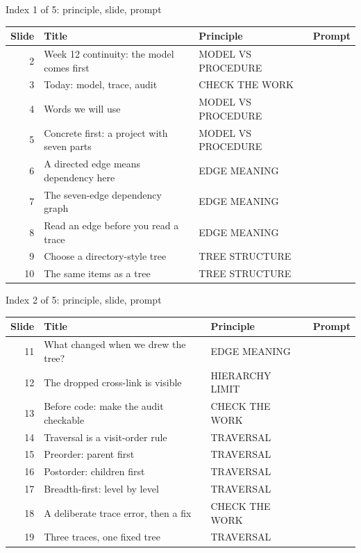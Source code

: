 \begin{frame}{Index 1 of 5: principle, slide, prompt}
\scriptsize
\begin{tabular}{@{}r>{\raggedright\arraybackslash}p{5.1cm}>{\raggedright\arraybackslash}p{4.7cm}p{1.2cm}@{}}
\textbf{Slide} & \textbf{Title} & \textbf{Principle} & \textbf{Prompt}\\\midrule
2 & Week 12 continuity: the model comes first & MODEL VS PROCEDURE & \\
3 & Today: model, trace, audit & CHECK THE WORK & \\
4 & Words we will use & MODEL VS PROCEDURE & \\
5 & Concrete first: a project with seven parts & MODEL VS PROCEDURE & \\
6 & A directed edge means dependency here & EDGE MEANING & \\
7 & The seven-edge dependency graph & EDGE MEANING & \\
8 & Read an edge before you read a trace & EDGE MEANING & \\
9 & Choose a directory-style tree & TREE STRUCTURE & \\
10 & The same items as a tree & TREE STRUCTURE & \\
\end{tabular}
\end{frame}
\begin{frame}{Index 2 of 5: principle, slide, prompt}
\scriptsize
\begin{tabular}{@{}r>{\raggedright\arraybackslash}p{5.1cm}>{\raggedright\arraybackslash}p{4.7cm}p{1.2cm}@{}}
\textbf{Slide} & \textbf{Title} & \textbf{Principle} & \textbf{Prompt}\\\midrule
11 & What changed when we drew the tree? & EDGE MEANING & \\
12 & The dropped cross-link is visible & HIERARCHY LIMIT & \\
13 & Before code: make the audit checkable & CHECK THE WORK & \\
14 & Traversal is a visit-order rule & TRAVERSAL & \\
15 & Preorder: parent first & TRAVERSAL & \\
16 & Postorder: children first & TRAVERSAL & \\
17 & Breadth-first: level by level & TRAVERSAL & \\
18 & A deliberate trace error, then a fix & CHECK THE WORK & \\
19 & Three traces, one fixed tree & TRAVERSAL & \\
\end{tabular}
\end{frame}
